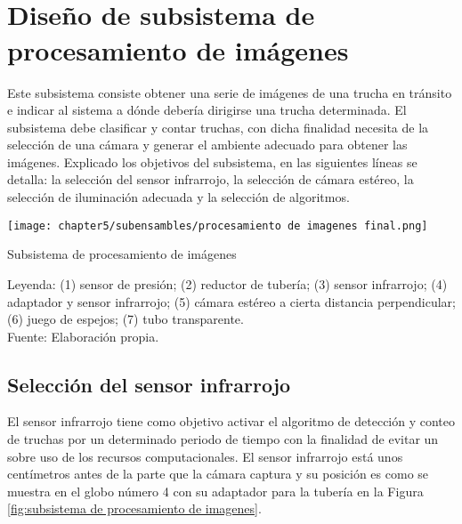 \chapter[\quad\quad\quad\quad ----- Diseño de subsistema de procesamiento de imágenes]{\\ Diseño de subsistema de procesamiento de imágenes}
\thispagestyle{myportland}

Este subsistema consiste obtener una serie de imágenes de una trucha en tránsito e indicar al sistema a dónde debería dirigirse una trucha determinada. El subsistema debe clasificar y contar truchas, con dicha finalidad necesita de la selección de una cámara y generar el ambiente adecuado para obtener las imágenes. Explicado los objetivos del subsistema, en las siguientes líneas se detalla: la selección del sensor infrarrojo, la selección de cámara estéreo, la selección de iluminación adecuada y la selección de algoritmos. %

\begin{myfigure}[H]
	\footnotesize\centering
	\texttt{[image: chapter5/subensambles/procesamiento de imagenes final.png]}
	\caption{Subsistema de procesamiento de imágenes}
	\begin{myflushcenter}
		Leyenda: (1) sensor de presión; (2) reductor de tubería; (3) sensor infrarrojo; (4) adaptador y sensor infrarrojo; (5) cámara estéreo a cierta distancia perpendicular; (6) juego de espejos; (7) tubo transparente.\\
		Fuente: Elaboración propia.
	\end{myflushcenter}
	\label{fig:subsistema de procesamiento de imagenes}
\end{myfigure}

\vspace{-2.0em}
 
\section{Selección del sensor infrarrojo}

El sensor infrarrojo tiene como objetivo activar el algoritmo de detección y conteo de truchas por un determinado periodo de tiempo con la finalidad de evitar un sobre uso de los recursos computacionales. El sensor infrarrojo está unos centímetros antes de la parte que la cámara captura y su posición es como se muestra en el globo número 4 con su adaptador para la tubería en la Figura \ref{fig:subsistema de procesamiento de imagenes}.

